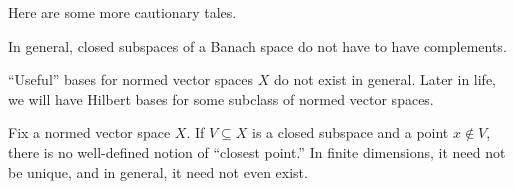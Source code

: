 \documentclass[../notes.tex]{subfiles}
\begin{document}
Here are some more cautionary tales.
\begin{remark}
	In general, closed subspaces of a Banach space do not have to have complements.
\end{remark}
\begin{remark}
	``Useful'' bases for normed vector spaces $X$ do not exist in general. Later in life, we will have Hilbert bases for some subclass of normed vector spaces.
\end{remark}
\begin{remark}
	Fix a normed vector space $X$. If $V\subseteq X$ is a closed subspace and a point $x\notin V$, there is no well-defined notion of ``closest point.'' In finite dimensions, it need not be unique, and in general, it need not even exist.
\end{remark}
\end{document}
